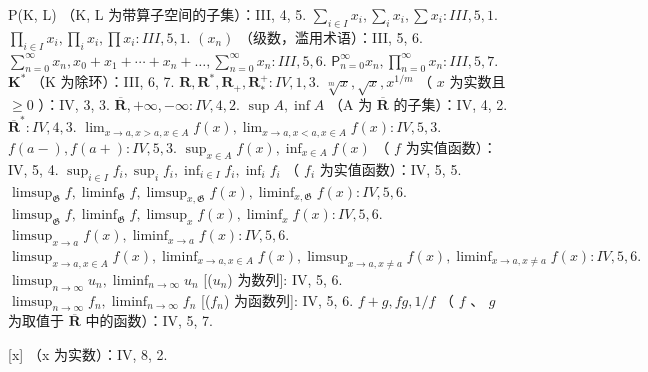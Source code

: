 P(K, L) （K, L 为带算子空间的子集）：III, 4, 5. \(\sum_{i \in I} x_i, \sum_{i} x_i, \sum x_i: III, 5, 1.\) \(\prod_{i \in I} x_i, \prod_{i} x_i, \prod x_i: III, 5, 1.\) \((x_n)\) （级数，滥用术语）：III, 5, 6. \(\sum_{n=0}^{\infty} x_n, x_0 + x_1 + \cdots + x_n + \ldots, \sum_{n=0}^{\infty} x_n: III, 5, 6.\) \(\mathsf{P}_{n=0}^{\infty} x_n, \prod_{n=0}^{\infty} x_n: III, 5, 7.\) \(\mathbf{K}^*\) （K 为除环）：III, 6, 7. \(\mathbf{R}, \mathbf{R}^*, \mathbf{R}_+, \mathbf{R}_*^+: IV, 1, 3.\) \(\sqrt[m]{x}, \sqrt{x}, x^{1/m}\) （ \(x\) 为实数且 \(\geqslant 0\) ）：IV, 3, 3. \(\overline{\mathbf{R}}, +\infty, -\infty: IV, 4, 2.\) \(\sup A, \inf A\) （A 为 \(\overline{\mathbf{R}}\) 的子集）：IV, 4, 2. \(\overline{\mathbf{R}}^*: IV, 4, 3.\) \(\lim_{x \to a, x > a, x \in A} f(x), \lim_{x \to a, x < a, x \in A} f(x): IV, 5, 3.\) \(f(a - ), f(a + ): IV, 5, 3.\) \(\sup_{x \in A} f(x), \inf_{x \in A} f(x)\) （ \(f\) 为实值函数）：IV, 5, 4. \(\sup_{i \in I} f_i, \sup_{i} f_i, \inf_{i \in I} f_i, \inf_{i} f_i\) （ \(f_i\) 为实值函数）：IV, 5, 5. \(\limsup_{\mathfrak{G}} f, \liminf_{\mathfrak{G}} f, \limsup_{x,\mathfrak{G}} f(x), \liminf_{x,\mathfrak{G}} f(x): IV, 5, 6.\) \(\limsup_{\mathfrak{G}} f, \liminf_{\mathfrak{G}} f, \limsup_{x} f(x), \liminf_{x} f(x): IV, 5, 6.\) \(\limsup_{x \to a} f(x), \liminf_{x \to a} f(x): IV, 5, 6.\) \(\limsup_{x \to a, x \in A} f(x), \liminf_{x \to a, x \in A} f(x), \limsup_{x \to a, x \neq a} f(x), \liminf_{x \to a, x \neq a} f(x): IV, 5, 6.\) \(\limsup_{n \to \infty} u_n, \liminf_{n \to \infty} u_n\) {[}(\(u_n\)) 为数列{]}: IV, 5, 6. \(\limsup_{n \to \infty} f_n, \liminf_{n \to \infty} f_n\) {[}(\(f_n\)) 为函数列{]}: IV, 5, 6. \(f + g, fg, 1/f\) （ \(f\) 、 \(g\) 为取值于 \(\overline{\mathbf{R}}\) 中的函数）：IV, 5, 7.

{[}x{]} （x 为实数）：IV, 8, 2.

